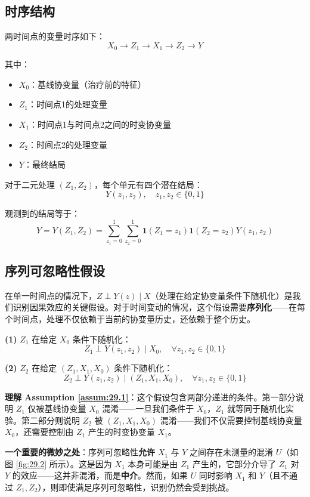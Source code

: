 \subsection{时序结构}

两时间点的变量时序如下：
\[
X_0 \to Z_1 \to X_1 \to Z_2 \to Y
\]

其中：
\begin{itemize}
  \item $X_0$：基线协变量（治疗前的特征）
  \item $Z_1$：时间点1的处理变量
  \item $X_1$：时间点1与时间点2之间的时变协变量
  \item $Z_2$：时间点2的处理变量
  \item $Y$：最终结局
\end{itemize}

对于二元处理 $(Z_1, Z_2)$，每个单元有四个潜在结局：
\[
Y(z_1, z_2), \quad z_1, z_2 \in \{0, 1\}
\]

观测到的结局等于：
\[
Y = Y(Z_1, Z_2) = \sum_{z_1=0}^1 \sum_{z_2=0}^1 \mathbf{1}(Z_1 = z_1) \mathbf{1}(Z_2 = z_2) Y(z_1, z_2)
\]

\subsection{序列可忽略性假设}

在单一时间点的情况下，$Z \perp Y(z) \mid X$（处理在给定协变量条件下随机化）是我们识别因果效应的关键假设。对于时间变动的情况，这个假设需要\textbf{序列化}——在每个时间点，处理不仅依赖于当前的协变量历史，还依赖于整个历史。

\begin{Assumption}[序列可忽略性]\label{assum:29.1}
\textbf{(1)} $Z_1$ 在给定 $X_0$ 条件下随机化：
\[
Z_1 \perp Y(z_1, z_2) \mid X_0, \quad \forall z_1, z_2 \in \{0, 1\}
\]

\textbf{(2)} $Z_2$ 在给定 $(Z_1, X_1, X_0)$ 条件下随机化：
\[
Z_2 \perp Y(z_1, z_2) \mid (Z_1, X_1, X_0), \quad \forall z_1, z_2 \in \{0, 1\}
\]
\end{Assumption}

\textbf{理解 Assumption \ref{assum:29.1}}：这个假设包含两部分递进的条件。第一部分说明 $Z_1$ 仅被基线协变量 $X_0$ 混淆——一旦我们条件于 $X_0$，$Z_1$ 就等同于随机化实验。第二部分则说明 $Z_2$ 被 $(Z_1, X_1, X_0)$ 混淆——我们不仅需要控制基线协变量 $X_0$，还需要控制由 $Z_1$ 产生的时变协变量 $X_1$。

\textbf{一个重要的微妙之处}：序列可忽略性\textbf{允许} $X_1$ 与 $Y$ 之间存在未测量的混淆 $U$（如图 \ref{fig:29.2} 所示）。这是因为 $X_1$ 本身可能是由 $Z_1$ 产生的，它部分介导了 $Z_1$ 对 $Y$ 的效应——这并非混淆，而是\textbf{中介}。然而，如果 $U$ 同时影响 $X_1$ 和 $Y$（且不通过 $Z_1, Z_2$），则即使满足序列可忽略性，识别仍然会受到挑战。

